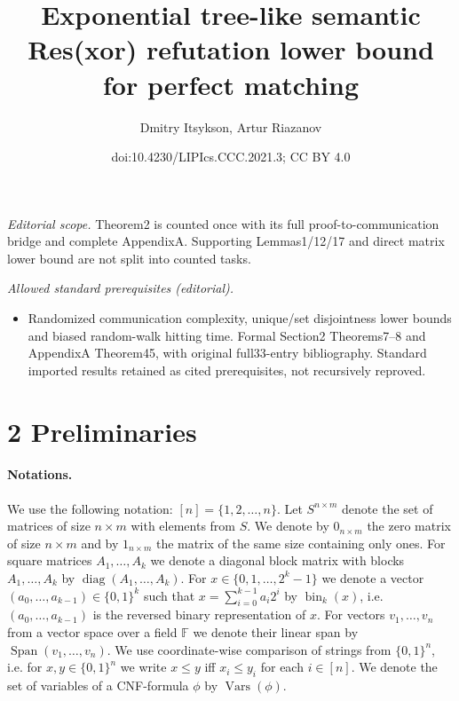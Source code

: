 \documentclass[10pt,a4paper]{article}
\title{Exponential tree-like semantic Res(xor) refutation lower bound for perfect matching}
\author{Dmitry Itsykson, Artur Riazanov}
\date{doi:10.4230/LIPIcs.CCC.2021.3; CC BY 4.0}
\begin{document}
\maketitle
\noindent\textit{Editorial scope.} Theorem2 is counted once with its full proof-to-communication bridge and complete AppendixA. Supporting Lemmas1/12/17 and direct matrix lower bound are not split into counted tasks.\par\medskip
\noindent\textit{Allowed standard prerequisites (editorial).}\begin{itemize}
\item Randomized communication complexity, unique/set disjointness lower bounds and biased random-walk hitting time. Formal Section2 Theorems7–8 and AppendixA Theorem45, with original full33-entry bibliography. Standard imported results retained as cited prerequisites, not recursively reproved.
\end{itemize}\medskip
\section*{2 Preliminaries}
\paragraph{Notations.} We use the following notation: $[n]=\{1,2,\ldots,n\}$. Let $S^{n\times m}$ denote the set of matrices of size $n\times m$ with elements from $S$. We denote by $0_{n\times m}$ the zero matrix of size $n\times m$ and by $1_{n\times m}$ the matrix of the same size containing only ones. For square matrices $A_1,\ldots,A_k$ we denote a diagonal block matrix with blocks $A_1,\ldots,A_k$ by $\operatorname{diag}(A_1,\ldots,A_k)$. For $x\in\{0,1,\ldots,2^k-1\}$ we denote a vector $(a_0,\ldots,a_{k-1})\in\{0,1\}^k$ such that $x=\sum_{i=0}^{k-1}a_i2^i$ by $\operatorname{bin}_k(x)$, i.e. $(a_0,\ldots,a_{k-1})$ is the reversed binary representation of $x$. For vectors $v_1,\ldots,v_n$ from a vector space over a field $\mathbb F$ we denote their linear span by $\operatorname{Span}(v_1,\ldots,v_n)$. We use coordinate-wise comparison of strings from $\{0,1\}^n$, i.e. for $x,y\in\{0,1\}^n$ we write $x\le y$ iff $x_i\le y_i$ for each $i\in[n]$. We denote the set of variables of a CNF-formula $\phi$ by $\operatorname{Vars}(\phi)$.
\end{document}
